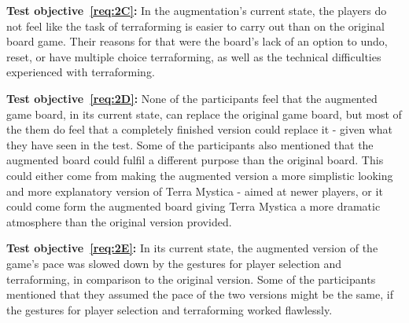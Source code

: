 \textbf{Test objective~\ref{req:2C}:} In the augmentation's current state, the players do not feel like the task of terraforming is easier to carry out than on the original board game. Their reasons for that were the board's lack of an option to undo, reset, or have multiple choice terraforming, as well as the technical difficulties experienced with terraforming. 

\textbf{Test objective~\ref{req:2D}:} None of the participants feel that the augmented game board, in its current state, can replace the original game board, but most of the them do feel that a completely finished version could replace it - given what they have seen in the test. Some of the participants also mentioned that the augmented board could fulfil a different purpose than the original board. This could either come from making the augmented version a more simplistic looking and more explanatory version of Terra Mystica - aimed at newer players, or it could come form the augmented board giving Terra Mystica a more dramatic atmosphere than the original version provided.

\textbf{Test objective~\ref{req:2E}:} In its current state, the augmented version of the game's pace was slowed down by the gestures for player selection and terraforming, in comparison to the original version. Some of the participants mentioned that they assumed the pace of the two versions might be the same, if the gestures for player selection and terraforming worked flawlessly. 